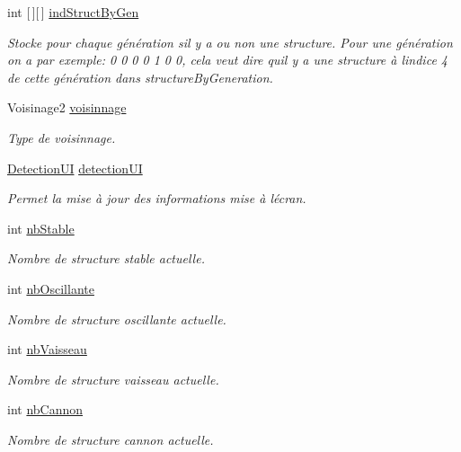 \begin{DoxyCompactItemize}
int \mbox{[}$\,$\mbox{]}\mbox{[}$\,$\mbox{]} \mbox{\hyperlink{class_detection_a7cffb153fd4b42ba87d6a099e31a424e}{ind\+Struct\+By\+Gen}}
\begin{DoxyCompactList}\small\item\em Stocke pour chaque génération s\textquotesingle{}il y a ou non une structure. Pour une génération on a par exemple\+: 0 0 0 0 1 0 0, cela veut dire qu\textquotesingle{}il y a une structure à l\textquotesingle{}indice 4 de cette génération dans structure\+By\+Generation. \end{DoxyCompactList}\item 
Voisinage2 \mbox{\hyperlink{class_detection_a6f99794fd28f6f79dedfc541f8b78154}{voisinnage}}
\begin{DoxyCompactList}\small\item\em Type de voisinnage. \end{DoxyCompactList}\item 
\mbox{\hyperlink{class_detection_u_i}{Detection\+UI}} \mbox{\hyperlink{class_detection_a2cb88a432e8b2083f27a286a32daf936}{detection\+UI}}
\begin{DoxyCompactList}\small\item\em Permet la mise à jour des informations mise à l\textquotesingle{}écran. \end{DoxyCompactList}\item 
int \mbox{\hyperlink{class_detection_a4b49d7d01d7b807387f89bbc03dc66b4}{nb\+Stable}}
\begin{DoxyCompactList}\small\item\em Nombre de structure stable actuelle. \end{DoxyCompactList}\item 
int \mbox{\hyperlink{class_detection_a0e0f6dbe71d5d7a5103416b6c5455faa}{nb\+Oscillante}}
\begin{DoxyCompactList}\small\item\em Nombre de structure oscillante actuelle. \end{DoxyCompactList}\item 
int \mbox{\hyperlink{class_detection_a7371f2754fb19faeee7e7711a42b6092}{nb\+Vaisseau}}
\begin{DoxyCompactList}\small\item\em Nombre de structure vaisseau actuelle. \end{DoxyCompactList}\item 
int \mbox{\hyperlink{class_detection_aa7929b2a7e34d53f93ed02da7a3d1ec8}{nb\+Cannon}}
\begin{DoxyCompactList}\small\item\em Nombre de structure cannon actuelle. \end{DoxyCompactList}\item 

\end{DoxyCompactItemize}
